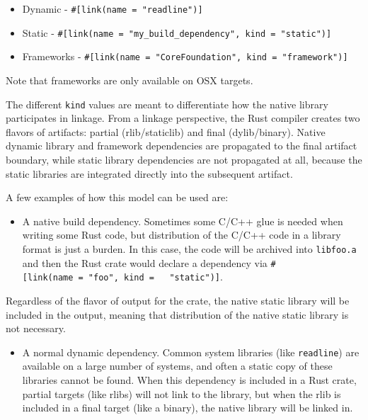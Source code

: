 \documentclass[a4paper,]{book}
\providecommand{\tightlist}{%
  \setlength{\itemsep}{0pt}\setlength{\parskip}{0pt}}
\begin{document}
\begin{itemize}
\tightlist
\item
  Dynamic - \texttt{\#{[}link(name\ =\ "readline"){]}}
\item
  Static -
  \texttt{\#{[}link(name\ =\ "my\_build\_dependency",\ kind\ =\ "static"){]}}
\item
  Frameworks -
  \texttt{\#{[}link(name\ =\ "CoreFoundation",\ kind\ =\ "framework"){]}}
\end{itemize}

Note that frameworks are only available on OSX targets.

The different \texttt{kind} values are meant to differentiate how the
native library participates in linkage. From a linkage perspective, the
Rust compiler creates two flavors of artifacts: partial (rlib/staticlib)
and final (dylib/binary). Native dynamic library and framework
dependencies are propagated to the final artifact boundary, while static
library dependencies are not propagated at all, because the static
libraries are integrated directly into the subsequent artifact.

A few examples of how this model can be used are:

\begin{itemize}
\tightlist
\item
  A native build dependency. Sometimes some C/C++ glue is needed when
  writing some Rust code, but distribution of the C/C++ code in a
  library format is just a burden. In this case, the code will be
  archived into \texttt{libfoo.a} and then the Rust crate would declare
  a dependency via
  \texttt{\#{[}link(name\ =\ "foo",\ kind\ =\ \ \ "static"){]}}.
\end{itemize}

Regardless of the flavor of output for the crate, the native static
library will be included in the output, meaning that distribution of the
native static library is not necessary.

\begin{itemize}
\tightlist
\item
  A normal dynamic dependency. Common system libraries (like
  \texttt{readline}) are available on a large number of systems, and
  often a static copy of these libraries cannot be found. When this
  dependency is included in a Rust crate, partial targets (like rlibs)
  will not link to the library, but when the rlib is included in a final
  target (like a binary), the native library will be linked in.
\end{itemize}
\end{document}
